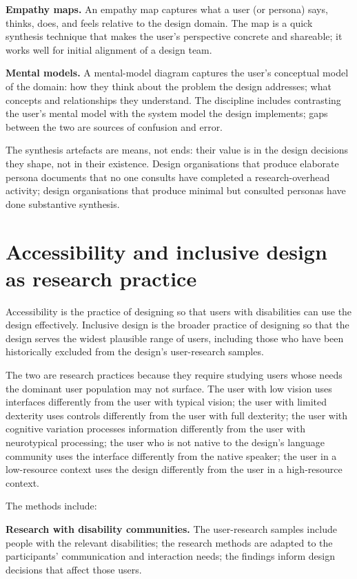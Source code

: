 \textbf{Empathy maps.} An empathy map captures what a user (or persona) says, thinks, does, and feels relative to the design domain. The map is a quick synthesis technique that makes the user's perspective concrete and shareable; it works well for initial alignment of a design team.

\textbf{Mental models.} A mental-model diagram captures the user's conceptual model of the domain: how they think about the problem the design addresses; what concepts and relationships they understand. The discipline includes contrasting the user's mental model with the system model the design implements; gaps between the two are sources of confusion and error.

The synthesis artefacts are means, not ends: their value is in the design decisions they shape, not in their existence. Design organisations that produce elaborate persona documents that no one consults have completed a research-overhead activity; design organisations that produce minimal but consulted personas have done substantive synthesis.

\section{Accessibility and inclusive design as research practice}

Accessibility is the practice of designing so that users with disabilities can use the design effectively. Inclusive design is the broader practice of designing so that the design serves the widest plausible range of users, including those who have been historically excluded from the design's user-research samples.

The two are research practices because they require studying users whose needs the dominant user population may not surface. The user with low vision uses interfaces differently from the user with typical vision; the user with limited dexterity uses controls differently from the user with full dexterity; the user with cognitive variation processes information differently from the user with neurotypical processing; the user who is not native to the design's language community uses the interface differently from the native speaker; the user in a low-resource context uses the design differently from the user in a high-resource context.

The methods include:

\textbf{Research with disability communities.} The user-research samples include people with the relevant disabilities; the research methods are adapted to the participants' communication and interaction needs; the findings inform design decisions that affect those users.

